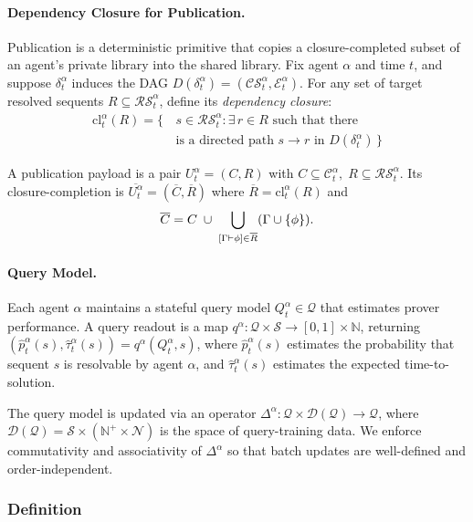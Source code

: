 \paragraph{Dependency Closure for Publication.}
 
Publication is a deterministic primitive that copies a closure-completed subset of an agent's private library
into the shared library. Fix agent $\alpha$ and time $t$, and suppose $\delta_t^\alpha$ induces the DAG
$D(\delta_t^\alpha)=(\mathcal{CS}_t^\alpha,\mathcal{E}_t^\alpha)$. For any set of target resolved sequents $R\subseteq \mathcal{RS}_t^\alpha$, define its \emph{dependency closure}:
\begin{align*}
\mathrm{cl}^{\alpha}_t(R) = 
\Big\{\, &s\in \mathcal{RS}_t^\alpha : \exists\, r\in R \text{ such that there}\\& \text{is a directed path } s\to r
\text{ in } D(\delta_t^\alpha)\,\Big\}
\end{align*}
 
A publication payload is a pair $U_t^\alpha=(C,R)$ with $C\subseteq \mathcal{C}_t^\alpha,\; R\subseteq \mathcal{RS}_t^\alpha$. Its closure-completion is $\overline{U_t^\alpha}=(\overline{C},\overline{R})$ where $\overline{R}=\mathrm{cl}^\alpha_t(R)$ and
\[\overline{C}= C \;\cup\; \bigcup_{[\Gamma\vdash\phi]\in \overline{R}}(\Gamma\cup\{\phi\}).\]
 
\paragraph{Query Model.}
 
Each agent $\alpha$ maintains a stateful query model $Q_t^\alpha \in \mathcal{Q}$ that estimates prover performance. A query readout is a map
$q^\alpha : \mathcal{Q}\times \mathcal{S} \to [0,1]\times \mathbb{N}$, returning $(\hat p_t^\alpha(s),\hat \tau_t^\alpha(s)) = q^\alpha(Q_t^\alpha,s)$, where $\hat p_t^\alpha(s)$ estimates the probability that sequent $s$ is resolvable by agent $\alpha$, and $\hat\tau_t^\alpha(s)$ estimates the expected time-to-solution.
 
The query model is updated via an operator $\Delta^\alpha : \mathcal{Q}\times \mathcal{D}(\mathcal{Q}) \to \mathcal{Q}$, where $\mathcal{D}(\mathcal{Q}) = \mathcal{S} \times (\mathbb{N}^+ \times \mathcal{N})$ is the space of query-training data. We enforce commutativity and associativity of $\Delta^\alpha$ so that batch updates are well-defined and order-independent.
 
 
\subsubsection{Definition}
 
